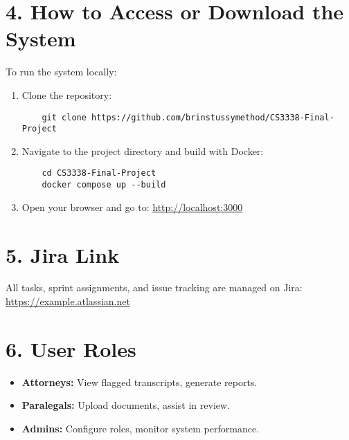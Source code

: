 \documentclass[11pt]{article}
\begin{document}
\section*{4. How to Access or Download the System}
To run the system locally:
\begin{enumerate}
    \item Clone the repository:
    \begin{verbatim}
    git clone https://github.com/brinstussymethod/CS3338-Final-Project
    \end{verbatim}
    \item Navigate to the project directory and build with Docker:
    \begin{verbatim}
    cd CS3338-Final-Project
    docker compose up --build
    \end{verbatim}
    \item Open your browser and go to:
    \url{http://localhost:3000}
\end{enumerate}

\section*{5. Jira Link}
All tasks, sprint assignments, and issue tracking are managed on Jira: \\
\url{https://example.atlassian.net}

\section*{6. User Roles}
\begin{itemize}
    \item \textbf{Attorneys:} View flagged transcripts, generate reports.
    \item \textbf{Paralegals:} Upload documents, assist in review.
    \item \textbf{Admins:} Configure roles, monitor system performance.
\end{itemize}
\end{document}
